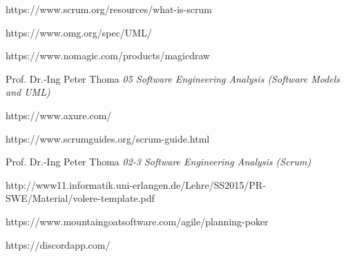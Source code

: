 \documentclass[a4paper, 12pt]{article}
\begin{document}
\newpage
\listoffigures

\newpage
\begin{thebibliography}{}

https://www.scrum.org/resources/what-is-scrum

https://www.omg.org/spec/UML/

https://www.nomagic.com/products/magicdraw

Prof. Dr.-Ing Peter Thoma \emph{05 Software Engineering Analysis (Software Models and UML)}

https://www.axure.com/

https://www.scrumguides.org/scrum-guide.html

Prof. Dr.-Ing Peter Thoma \emph{02-3 Software Engineering Analysis (Scrum)}

http://www11.informatik.uni-erlangen.de/Lehre/SS2015/PR-SWE/Material/volere-template.pdf

https://www.mountaingoatsoftware.com/agile/planning-poker

https://discordapp.com/

\end{thebibliography}
\end{document}
